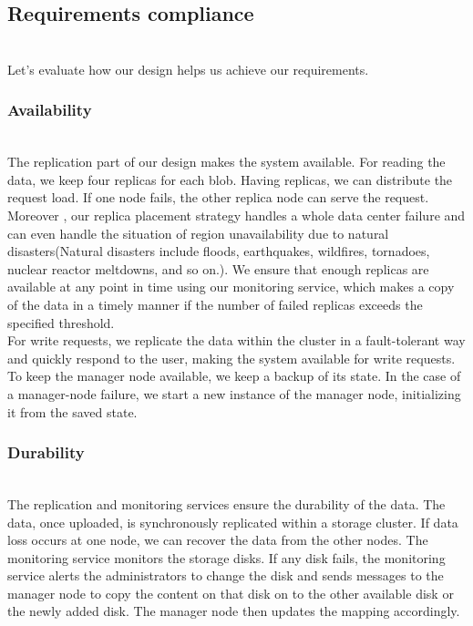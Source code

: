 

\subsection{Requirements compliance}\label{YF6t9xGZLYhSh4uV6F431}
\\
Let's evaluate how our design helps us achieve our requirements.

\subsubsection{Availability}\label{q4kSKHryY0ZcXXR4hZuwm}
\\
The replication part of our design makes the system available. For reading the data, we keep four replicas for each blob. Having replicas, we can distribute the request load. If one node fails, the other replica node can serve the request. Moreover , our replica placement strategy handles a whole data center failure and can even handle the situation of region unavailability due to natural disasters(Natural disasters include floods, earthquakes, wildfires, tornadoes, nuclear reactor meltdowns, and so on.). We ensure that enough replicas are available at any point in time using our monitoring service, which makes a copy of the data in a timely manner if the number of failed replicas exceeds the specified threshold.
\\
For write requests, we replicate the data within the cluster in a fault-tolerant way and quickly respond to the user, making the system available for write requests.
\\
To keep the manager node available, we keep a backup of its state. In the case of a manager-node failure, we start a new instance of the manager node, initializing it from the saved state.

\subsubsection{Durability}\label{BPqJ9d8xZh6PGTwbAh9p9}
\\
The replication and monitoring services ensure the durability of the data. The data, once uploaded, is synchronously replicated within a storage cluster. If data loss occurs at one node, we can recover the data from the other nodes. The monitoring service monitors the storage disks. If any disk fails, the monitoring service alerts the administrators to change the disk and sends messages to the manager node to copy the content on that disk on to the other available disk or the newly added disk. The manager node then updates the mapping accordingly.


